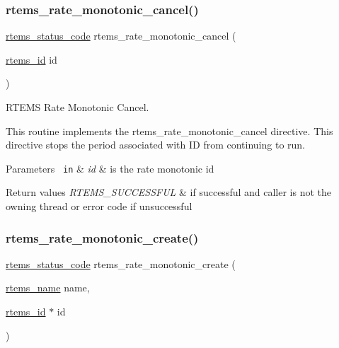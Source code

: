 \subsubsection{\texorpdfstring{rtems\_rate\_monotonic\_cancel()}{rtems\_rate\_monotonic\_cancel()}}
{\footnotesize\ttfamily \mbox{\hyperlink{group__ClassicStatus_ga545d41846817eaba6143d52ee4d9e9fe}{rtems\+\_\+status\+\_\+code}} rtems\+\_\+rate\+\_\+monotonic\+\_\+cancel (\begin{DoxyParamCaption}\item[{\mbox{\hyperlink{group__ClassicTasks_gab20892b814dced7dd4e5b9bf42becd57}{rtems\+\_\+id}}}]{id }\end{DoxyParamCaption})}



R\+T\+E\+MS Rate Monotonic Cancel. 

This routine implements the rtems\+\_\+rate\+\_\+monotonic\+\_\+cancel directive. This directive stops the period associated with ID from continuing to run.


\begin{DoxyParams}[1]{Parameters}
\mbox{\texttt{ in}}  & {\em id} & is the rate monotonic id\\
\hline
\end{DoxyParams}

\begin{DoxyRetVals}{Return values}
{\em R\+T\+E\+M\+S\+\_\+\+S\+U\+C\+C\+E\+S\+S\+F\+UL} & if successful and caller is not the owning thread or error code if unsuccessful \\
\hline
\end{DoxyRetVals}
\mbox{\label{group__ClassicRateMon_gab599ee7e8f65f1d1461a3a5e198491eb}} 
\subsubsection{\texorpdfstring{rtems\_rate\_monotonic\_create()}{rtems\_rate\_monotonic\_create()}}
{\footnotesize\ttfamily \mbox{\hyperlink{group__ClassicStatus_ga545d41846817eaba6143d52ee4d9e9fe}{rtems\+\_\+status\+\_\+code}} rtems\+\_\+rate\+\_\+monotonic\+\_\+create (\begin{DoxyParamCaption}\item[{\mbox{\hyperlink{group__ClassicTasks_ga55fb63c49f68c0cbd9bee004da15b1fd}{rtems\+\_\+name}}}]{name,  }\item[{\mbox{\hyperlink{group__ClassicTasks_gab20892b814dced7dd4e5b9bf42becd57}{rtems\+\_\+id}} $\ast$}]{id }\end{DoxyParamCaption})}



